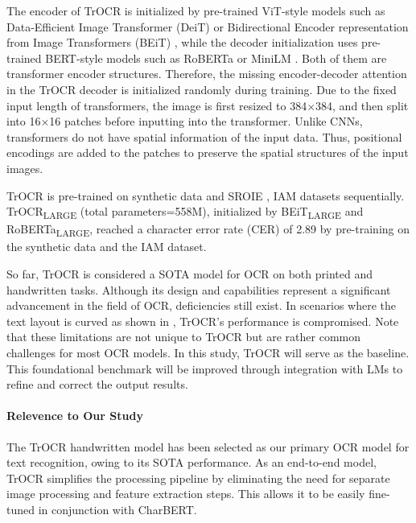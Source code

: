 The encoder of TrOCR is initialized by pre-trained ViT-style models such as Data-Efficient Image Transformer (DeiT) \citep{touvron2021training} or Bidirectional Encoder representation from Image Transformers (BEiT) \citep{bao2022beit}, while the decoder initialization uses pre-trained BERT-style models such as RoBERTa \citep{liu2019roberta} or MiniLM \citep{wang2020minilm}. Both of them are transformer encoder structures. Therefore, the missing encoder-decoder attention in the TrOCR decoder is initialized randomly during training. Due to the fixed input length of transformers, the image is first resized to 384$\times$384, and then split into 16$\times$16 patches before inputting into the transformer. Unlike CNNs, transformers do not have spatial information of the input data. Thus, positional encodings are added to the patches to preserve the spatial structures of the input images.

TrOCR is pre-trained on synthetic data and SROIE \citep{huang2019icdar2019}, IAM datasets \citep{marti1999full} sequentially. TrOCR\textsubscript{LARGE} (total parameters=558M), initialized by BEiT\textsubscript{LARGE} and RoBERTa\textsubscript{LARGE}, reached a character error rate (CER) \citep{klakow2002testing}\citep{wang2003word} of 2.89 by pre-training on the synthetic data and the IAM dataset.

So far, TrOCR is considered a SOTA model for OCR on both printed and handwritten tasks. Although its design and capabilities represent a significant advancement in the field of OCR, deficiencies still exist. In scenarios where the text layout is curved as shown in , TrOCR's performance is compromised. Note that these limitations are not unique to TrOCR but are rather common challenges for most OCR models. In this study, TrOCR will serve as the baseline. This foundational benchmark will be improved through integration with LMs to refine and correct the output results.

\paragraph*{Relevence to Our Study}
The TrOCR handwritten model has been selected as our primary OCR model for text recognition, owing to its SOTA performance. As an end-to-end model, TrOCR simplifies the processing pipeline by eliminating the need for separate image processing and feature extraction steps. This allows it to be easily fine-tuned in conjunction with CharBERT.


